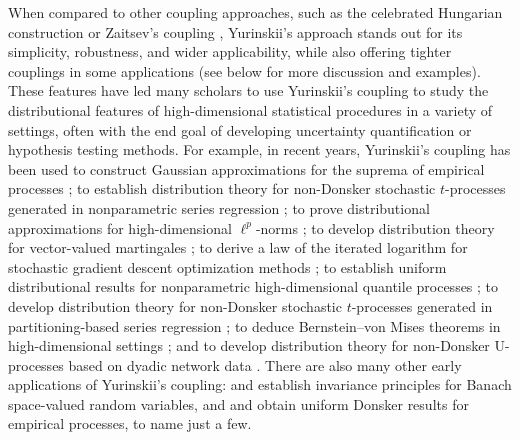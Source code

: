 When compared to other coupling approaches, such as the celebrated Hungarian
construction \citep{komlos1975approximation} or Zaitsev's coupling
\citep{zaitsev1987estimates,zaitsev1987gaussian}, Yurinskii's approach stands
out for its simplicity, robustness, and wider applicability, while also offering
tighter couplings in some applications (see below for more discussion and
examples). These features have led many scholars to use Yurinskii's coupling to
study the distributional features of high-dimensional statistical procedures in
a variety of settings, often with the end goal of developing uncertainty
quantification or hypothesis testing methods. For example, in recent years,
Yurinskii's coupling has been used
to construct Gaussian approximations for the suprema of empirical processes
\citep{chernozhukov2014gaussian};
%
to establish distribution theory for non-Donsker stochastic $t$-processes
generated in nonparametric series regression \citep{belloni2015some};
%
to prove distributional approximations for
high-dimensional $\ell^p$-norms \citep{biau2015high};
%
to develop distribution theory for vector-valued martingales
\citep{belloni2018high,li2020uniform};
%
to derive a law of the iterated logarithm for stochastic gradient descent
optimization methods \citep{anastasiou2019normal};
%
to establish uniform distributional results for nonparametric
high-dimensional quantile processes \citep{belloni2019conditional};
%
to develop distribution theory for non-Donsker stochastic
$t$-processes generated in partitioning-based series regression
\citep{cattaneo2020large};
%
to deduce Bernstein--von Mises theorems in high-dimensional settings
\citep{ray2021bernstein};
%
and to develop distribution theory for non-Donsker U-processes based on dyadic
network data \citep{cattaneo2024uniform}.
%
%
There are also many other early applications of Yurinskii's coupling:
\citet{dudley1983invariance} and \citet{dehling1983limit} establish invariance
principles for Banach space-valued random variables, and \citet{lecam1988} and
\citet{sheehy1992uniform} obtain uniform Donsker results for empirical
processes, to name just a few.

